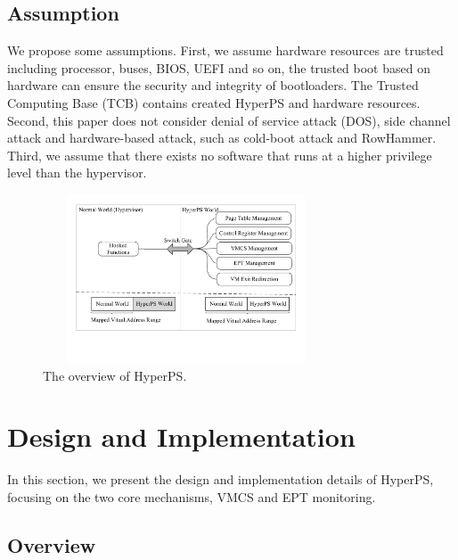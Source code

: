 ﻿\documentclass[conference]{IEEEtran}
\begin{document}
\subsection{Assumption}
We propose some assumptions.
First, we assume hardware resources are trusted including processor, buses, BIOS, UEFI and so on, the trusted boot based on hardware can ensure the security and integrity of bootloaders. The Trusted Computing Base (TCB) contains created HyperPS and hardware resources. Second, this paper does not consider denial of service attack (DOS), side channel attack and hardware-based attack, such as cold-boot attack and RowHammer. Third, we assume that there exists no software that runs at a higher privilege level than the hypervisor.



\begin{figure}
\centerline{\includegraphics[width=8.5cm, height=5cm]{overview-e.pdf}}%
\setlength{\abovecaptionskip}{3pt}
\setlength{\belowcaptionskip}{2pt}
\caption{The overview of HyperPS. } \label{fig1}
\end{figure}

\section{Design and Implementation}\label{sec:design}

In this section, we present the design and implementation
details of HyperPS, focusing on the two core mechanisms, VMCS and EPT monitoring.



\subsection{Overview} 
\end{document}
